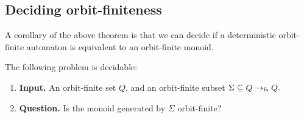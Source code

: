 \subsection{Deciding orbit-finiteness}
\label{sec:deciding-monoids}
A corollary of the above theorem is that we can decide if a deterministic orbit-finite automaton is equivalent to an orbit-finite monoid. 

\begin{corollary}
    \label{cor:decide-orbit-finite-submonoids}
    The following problem is decidable: 
    \begin{enumerate}
        \item \textbf{Input.} An orbit-finite set $Q$, and an orbit-finite subset 
        $
        \Sigma \subseteq Q \to_{\text{fs}} Q.$
        \item \textbf{Question.} Is the monoid generated by $\Sigma$ orbit-finite?
    \end{enumerate}
\end{corollary}
